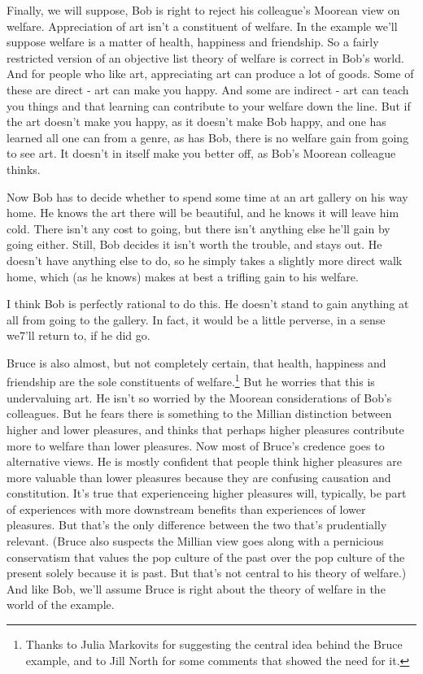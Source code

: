 \documentclass[
  11pt,
  letterpaper,
  DIV=11,
  numbers=noendperiod,
  twoside]{scrartcl}
\begin{document}
Finally, we will suppose, Bob is right to reject his colleague's Moorean
view on welfare. Appreciation of art isn't a constituent of welfare. In
the example we'll suppose welfare is a matter of health, happiness and
friendship. So a fairly restricted version of an objective list theory
of welfare is correct in Bob's world. And for people who like art,
appreciating art can produce a lot of goods. Some of these are direct -
art can make you happy. And some are indirect - art can teach you things
and that learning can contribute to your welfare down the line. But if
the art doesn't make you happy, as it doesn't make Bob happy, and one
has learned all one can from a genre, as has Bob, there is no welfare
gain from going to see art. It doesn't in itself make you better off, as
Bob's Moorean colleague thinks.

Now Bob has to decide whether to spend some time at an art gallery on
his way home. He knows the art there will be beautiful, and he knows it
will leave him cold. There isn't any cost to going, but there isn't
anything else he'll gain by going either. Still, Bob decides it isn't
worth the trouble, and stays out. He doesn't have anything else to do,
so he simply takes a slightly more direct walk home, which (as he knows)
makes at best a trifling gain to his welfare.

I think Bob is perfectly rational to do this. He doesn't stand to gain
anything at all from going to the gallery. In fact, it would be a little
perverse, in a sense we7'll return to, if he did go.

Bruce is also almost, but not completely certain, that health, happiness
and friendship are the sole constituents of welfare.\footnote{Thanks to
  Julia Markovits for suggesting the central idea behind the Bruce
  example, and to Jill North for some comments that showed the need for
  it.} But he worries that this is undervaluing art. He isn't so worried
by the Moorean considerations of Bob's colleagues. But he fears there is
something to the Millian distinction between higher and lower pleasures,
and thinks that perhaps higher pleasures contribute more to welfare than
lower pleasures. Now most of Bruce's credence goes to alternative views.
He is mostly confident that people think higher pleasures are more
valuable than lower pleasures because they are confusing causation and
constitution. It's true that experienceing higher pleasures will,
typically, be part of experiences with more downstream benefits than
experiences of lower pleasures. But that's the only difference between
the two that's prudentially relevant. (Bruce also suspects the Millian
view goes along with a pernicious conservatism that values the pop
culture of the past over the pop culture of the present solely because
it is past. But that's not central to his theory of welfare.) And like
Bob, we'll assume Bruce is right about the theory of welfare in the
world of the example.
\end{document}
